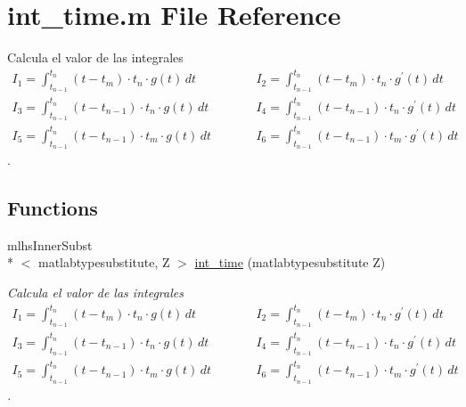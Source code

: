 \hypertarget{a00024}{\section{int\-\_\-time.\-m File Reference}
\label{a00024}
}


Calcula el valor de las integrales \begin{eqnarray*} I_1 =\int_{t_{n-1}}^{t_{n}} (t-t_{m})\cdot t_{n} \cdot g(t) \, dt &\qquad& I_2 =\int_{t_{n-1}}^{t_{n}} (t-t_{m})\cdot t_{n} \cdot g^{\prime}(t) \, dt \\[3mm] I_3 = \int_{t_{n-1}}^{t_{n}} (t-t_{n-1})\cdot t_{n} \cdot g(t) \, dt &\qquad& I_4 = \int_{t_{n-1}}^{t_{n}} (t-t_{n-1})\cdot t_{n} \cdot g^{\prime}(t) \, dt \\[3mm] I_5 = \int_{t_{n-1}}^{t_{n}} (t-t_{n-1})\cdot t_{m} \cdot g(t) \, dt &\qquad& I_6 = \int_{t_{n-1}}^{t_{n}} (t-t_{n-1})\cdot t_{m} \cdot g^{\prime}(t) \, dt \ \end{eqnarray*}.  


\subsection*{Functions}
\begin{DoxyCompactItemize}
\item 
mlhs\-Inner\-Subst\\*
$<$ matlabtypesubstitute, Z $>$ \hyperlink{a00024_ac36b34d8a822fd1d7a80a5bc546a0ca2}{int\-\_\-time} (matlabtypesubstitute Z)
\begin{DoxyCompactList}\small\item\em Calcula el valor de las integrales \begin{eqnarray*} I_1 =\int_{t_{n-1}}^{t_{n}} (t-t_{m})\cdot t_{n} \cdot g(t) \, dt &\qquad& I_2 =\int_{t_{n-1}}^{t_{n}} (t-t_{m})\cdot t_{n} \cdot g^{\prime}(t) \, dt \\[3mm] I_3 = \int_{t_{n-1}}^{t_{n}} (t-t_{n-1})\cdot t_{n} \cdot g(t) \, dt &\qquad& I_4 = \int_{t_{n-1}}^{t_{n}} (t-t_{n-1})\cdot t_{n} \cdot g^{\prime}(t) \, dt \\[3mm] I_5 = \int_{t_{n-1}}^{t_{n}} (t-t_{n-1})\cdot t_{m} \cdot g(t) \, dt &\qquad& I_6 = \int_{t_{n-1}}^{t_{n}} (t-t_{n-1})\cdot t_{m} \cdot g^{\prime}(t) \, dt \ \end{eqnarray*}. \end{DoxyCompactList}\end{DoxyCompactItemize}


